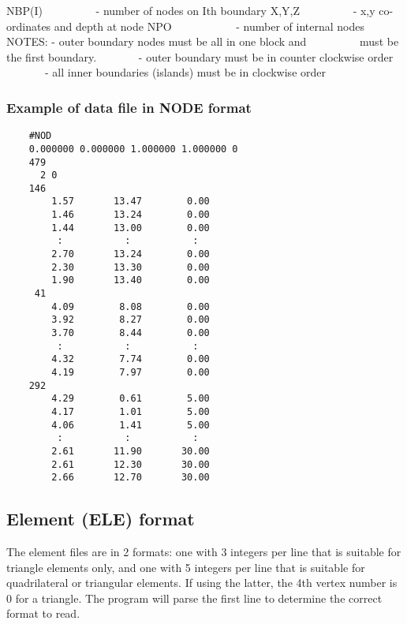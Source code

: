 \documentclass{article}
\begin{document}
NBP(I) \ \ \ \ \ \ \ \ \ {}- number of nodes on Ith boundary\newline
X,Y,Z \ \ \ \ \ \ \ \ \ {}- x,y co-ordinates and depth at node\newline
NPO \ \ \ \ \ \ \ \ \ \ \ {}- number of internal nodes\newline
 \ \ \ \ \newline
 NOTES: - outer boundary nodes must be all in one block and\newline
 \ \ \ \ \ \ \ \ \ must be the first boundary.\newline
 \ \ \ \ \ \ \ {}- outer boundary must be in counter clockwise order\newline
 \ \ \ \ \ \ \ {}- all inner boundaries (islands) must be in clockwise order


\newpage
\subsubsection{Example of data file in NODE format}

\begin{small}
\begin{lstlisting}
    #NOD 
    0.000000 0.000000 1.000000 1.000000 0 
    479
      2 0
    146
        1.57       13.47        0.00
        1.46       13.24        0.00
        1.44       13.00        0.00
         :           :           :
        2.70       13.24        0.00
        2.30       13.30        0.00
        1.90       13.40        0.00
     41
        4.09        8.08        0.00
        3.92        8.27        0.00
        3.70        8.44        0.00
         :           :           :
        4.32        7.74        0.00
        4.19        7.97        0.00
    292
        4.29        0.61        5.00
        4.17        1.01        5.00
        4.06        1.41        5.00
         :           :           :
        2.61       11.90       30.00
        2.61       12.30       30.00
        2.66       12.70       30.00
\end{lstlisting}
\end{small}

\newpage
\subsection[Element (ELE) format]{Element (ELE) format}

The element files are in 2 formats: one with 3 integers per line that is suitable for
triangle elements only, and one with 5 integers per line that is suitable for 
quadrilateral or triangular elements. If using the latter, the 4th vertex number
is 0 for a triangle. The program will parse the first line
to determine the correct format to read.
\end{document}
